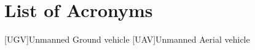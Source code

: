 \chapter*{List of Acronyms}
\label{acronyms}

\begin{acronym}
    [UGV]{Unmanned Ground vehicle}
    [UAV]{Unmanned Aerial vehicle}
\end{acronym}